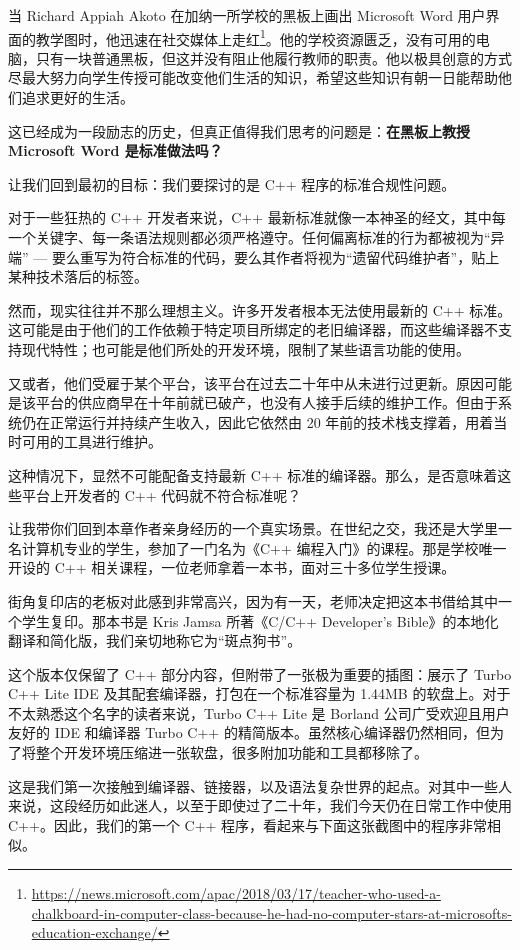 当 Richard Appiah Akoto 在加纳一所学校的黑板上画出 Microsoft Word 用户界面的教学图时，他迅速在社交媒体上走红\footnote{\url{https://news.microsoft.com/apac/2018/03/17/teacher-who-used-a-chalkboard-in-computer-class-because-he-had-no-computer-stars-at-microsofts-education-exchange/}}。他的学校资源匮乏，没有可用的电脑，只有一块普通黑板，但这并没有阻止他履行教师的职责。他以极具创意的方式尽最大努力向学生传授可能改变他们生活的知识，希望这些知识有朝一日能帮助他们追求更好的生活。

这已经成为一段励志的历史，但真正值得我们思考的问题是：\textbf{在黑板上教授 Microsoft Word 是标准做法吗？}

让我们回到最初的目标：我们要探讨的是 C++ 程序的标准合规性问题。

对于一些狂热的 C++ 开发者来说，C++ 最新标准就像一本神圣的经文，其中每一个关键字、每一条语法规则都必须严格遵守。任何偏离标准的行为都被视为“异端” --- 要么重写为符合标准的代码，要么其作者将视为“遗留代码维护者”，贴上某种技术落后的标签。

然而，现实往往并不那么理想主义。许多开发者根本无法使用最新的 C++ 标准。这可能是由于他们的工作依赖于特定项目所绑定的老旧编译器，而这些编译器不支持现代特性；也可能是他们所处的开发环境，限制了某些语言功能的使用。

又或者，他们受雇于某个平台，该平台在过去二十年中从未进行过更新。原因可能是该平台的供应商早在十年前就已破产，也没有人接手后续的维护工作。但由于系统仍在正常运行并持续产生收入，因此它依然由 20 年前的技术栈支撑着，用着当时可用的工具进行维护。

这种情况下，显然不可能配备支持最新 C++ 标准的编译器。那么，是否意味着这些平台上开发者的 C++ 代码就不符合标准呢？

让我带你们回到本章作者亲身经历的一个真实场景。在世纪之交，我还是大学里一名计算机专业的学生，参加了一门名为《C++ 编程入门》的课程。那是学校唯一开设的 C++ 相关课程，一位老师拿着一本书，面对三十多位学生授课。

街角复印店的老板对此感到非常高兴，因为有一天，老师决定把这本书借给其中一个学生复印。那本书是 Kris Jamsa 所著《C/C++ Developer's Bible》的本地化翻译和简化版，我们亲切地称它为“斑点狗书”。

这个版本仅保留了 C++ 部分内容，但附带了一张极为重要的插图：展示了 Turbo C++ Lite IDE 及其配套编译器，打包在一个标准容量为 1.44MB 的软盘上。对于不太熟悉这个名字的读者来说，Turbo C++ Lite 是 Borland 公司广受欢迎且用户友好的 IDE 和编译器 Turbo C++ 的精简版本。虽然核心编译器仍然相同，但为了将整个开发环境压缩进一张软盘，很多附加功能和工具都移除了。

这是我们第一次接触到编译器、链接器，以及语法复杂世界的起点。对其中一些人来说，这段经历如此迷人，以至于即使过了二十年，我们今天仍在日常工作中使用 C++。因此，我们的第一个 C++ 程序，看起来与下面这张截图中的程序非常相似。


